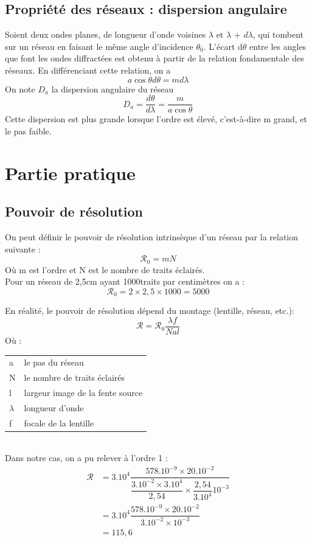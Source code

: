 \documentclass[12pt,a4paper]{article}
\begin{document}
	\subsection{Propriété des réseaux : dispersion angulaire}
	Soient deux ondes planes, de longueur d'onde voisines $\lambda$ et $\lambda$ + $d\lambda$, qui tombent sur un réseau en faisant le même angle d'incidence $\theta_0$. L'écart d$\theta$ entre les angles que font les ondes diffractées est obtenu à partir de la relation fondamentale des réseaux. En différenciant cette relation, on a
	$$a\cos\theta d\theta=md\lambda$$
	On note $D_a$ la dispersion angulaire du réseau
	$$D_a = \dfrac{d\theta}{d\lambda}=\dfrac{m}{a\cos\theta}$$
	Cette dispersion est plus grande lorsque l'ordre est élevé, c'est-à-dire m grand, et le pas faible.
	
	\section{Partie pratique}
	\subsection{Pouvoir de résolution}
	On peut définir le pouvoir de résolution intrinsèque d'un réseau par la relation suivante :
	$$\mathcal{R}_0=mN$$
	Où m est l'ordre et N est le nombre de traits éclairés.\\
	Pour un réseau de 2,5cm ayant 1000traits par centimètres on a : $$\mathcal{R}_0=2\times2,5\times1000=5000$$
	
	En réalité, le pouvoir de résolution dépend du montage (lentille, réseau, etc.):
	$$\mathcal{R}=\mathcal{R}_0\dfrac{\lambda f}{Nal}$$
	Où : \\
	\begin{tabular}{ll}
		a    & le pas du réseau\\
		N    & le nombre de traits éclairés\\
		l    & largeur image de la fente source\\
		$\lambda$ & longueur d'onde\\
		f   & focale de la lentille
	\end{tabular}
	\\
	
	Dans notre cas, on a pu relever à l'ordre 1 :
	\begin{align*}
	\mathcal{R} &=3.10^4\dfrac{578.10^{-9}\times20.10^{-2}}{\dfrac{3.10^{-2}\times3.10^4}{2,54}\times\dfrac{2,54}{3.10^4}10^{-3}}\\[1em]
	&=3.10^4\dfrac{578.10^{-9}\times20.10^{-2}}{3.10^{-2}\times10^{-3}}\\
	&=115,6
	\end{align*}
	
\end{document}

